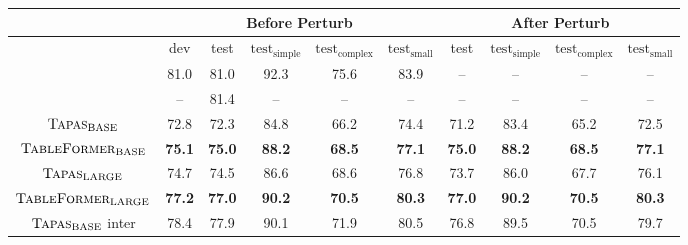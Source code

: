 \documentclass[11pt]{article}
\begin{document}
\begin{table*}
\footnotesize
\centering
\begin{tabular}{cccccc|cccc}
\toprule
& \multicolumn{5}{c|}{ \bf Before Perturb} & \multicolumn{4}{c}{\bf After Perturb} \\\midrule
& dev           & test          & $\text{test}_{\text{simple}}$  & $\text{test}_{\text{complex}}$ & $\text{test}_{\text{small}}$   & test       & $\text{test}_{\text{simple}}$  & $\text{test}_{\text{complex}}$       & $\text{test}_{\text{small}}$   \\\midrule
\citet{eisenschlos-etal-2020-understanding} & 81.0  & 81.0  & 92.3  & 75.6 & 83.9  & --  &  --  &  -- &  -- \\
\citet{eisenschlos2021mate} & -- & 81.4 & -- & -- & -- & -- & -- & -- & -- \\\midrule
$\textsc{Tapas}_{\text{BASE}}$                                           & 72.8          & 72.3          & 84.8          & 66.2          & 74.4 & 71.2 & 83.4 & 65.2 & 72.5          \\
$\textsc{TableFormer}_{\text{BASE}}$                                   & \textbf{75.1} & \textbf{75.0} & \textbf{88.2} & \textbf{68.5} & \textbf{77.1}                                       & \textbf{75.0}                                       & \textbf{88.2}                                       & \textbf{68.5}                                       & \textbf{77.1} \\\midrule
$\textsc{Tapas}_{\text{LARGE}}$                                         & 74.7          & 74.5          & 86.6          & 68.6          & 76.8                                                & 73.7                                                & 86.0                                                & 67.7                                                & 76.1          \\
$\textsc{TableFormer}_{\text{LARGE}}$                                 & \textbf{77.2} & \textbf{77.0} & \textbf{90.2} & \textbf{70.5} & \textbf{80.3}                                       & \textbf{77.0}                                       & \textbf{90.2}                                       & \textbf{70.5}                                       & \textbf{80.3} \\\midrule
$\textsc{Tapas}_{\text{BASE}}$ inter                           & 78.4          & 77.9          & 90.1          & 71.9          & 80.5                                                & 76.8                                                & 89.5                                                & 70.5                                                & 79.7          \\

\end{tabular}
\end{table*}
\end{document}

